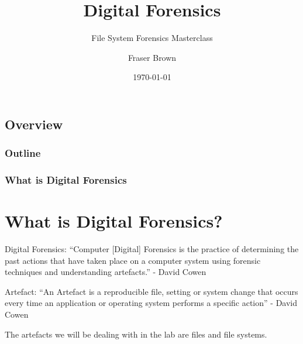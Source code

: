 \documentclass{beamer}
\title{Digital Forensics}
\subtitle{File System Forensics Masterclass}
\author{Fraser Brown}
\institute{Heriot-Watt University}
\date{\today}
\begin{document}
\begin{frame}
\titlepage
\end{frame}

\begin{frame}
\section*{Overview}
\frametitle{Outline}
\tableofcontents
\end{frame}

\begin{frame}
	\frametitle{What is Digital Forensics}
	\section{What is Digital Forensics?}
	\begin{block}{Digital Forensics:}
		``Computer [Digital] Forensics is the practice of determining the past actions that have taken place on a computer system using forensic techniques and understanding artefacts.'' - David Cowen
	\end{block}
		
	\begin{block}{Artefact:}
		``An Artefact is a reproducible file, setting or system change that occurs every time an application or operating system performs a specific action'' - David Cowen
	\end{block}

	The artefacts we will be dealing with in the lab are files and file systems.
\end{frame}
\end{document}
